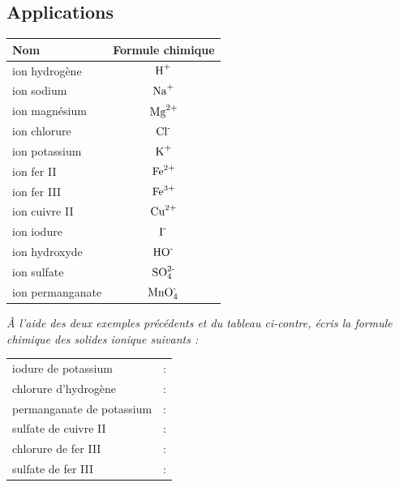 \documentclass[12pt,a4paper]{article}
\renewcommand\arraystretch{1.7}		%
\begin{document}
\subsection{Applications}

\begin{multicols}{2}
{
\center
\renewcommand*{\arraystretch}{1}
\begin{tabular}{l | c}
\textbf{Nom} & \textbf{Formule chimique} \\
\hline\hline
ion hydrogène 	& $\text{H}^\text{+}$ \\
ion sodium     	& $\text{Na}^\text{+}$ \\
ion magnésium	& $\text{Mg}^\text{2+}$ \\
ion chlorure		& $\text{Cl}^\text{-}$ \\
ion potassium 	& $\text{K}^\text{+}$ \\
ion fer II			 	& $\text{Fe}^\text{2+}$ \\
ion fer III			 	& $\text{Fe}^\text{3+}$ \\
ion cuivre II	 	& $\text{Cu}^\text{2+}$ \\
ion iodure		 	& $\text{I}^\text{-}$ \\
ion hydroxyde	& $\text{HO}^\text{-}$ \\
ion sulfate			& $\text{SO}_\text{4}^\text{2-}$ \\
ion permanganate & $\text{MnO}_\text{4}^\text{-}$
\end{tabular}
}

\emph{À l'aide des deux exemples précédents et du tableau ci-contre, écris la formule chimique des solides ionique suivants :}

\noindent
\begin{tabular}{l l}
\textbullet{} iodure de potassium 				& : \\
\textbullet{} chlorure d'hydrogène 				& : \\
\textbullet{} permanganate de potassium	& : \\
\textbullet{} sulfate de cuivre II					& : \\
\textbullet{} chlorure de fer III						& : \\
\textbullet{} sulfate de fer III						& :
\end{tabular}
\end{multicols}
\end{document}
